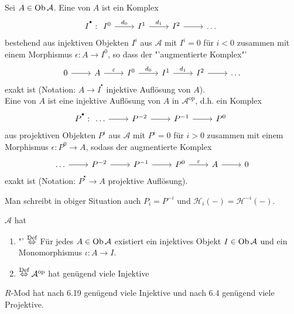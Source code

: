 \begin{df}\label{7.5}
	Sei $A\in \text{Ob}\,\mathcal{A}$. Eine  von $A$ ist ein Komplex 
	$$I^{^\bullet}: \begin{tikzcd}
	I^0\arrow{r}{d_0} & I^1 \arrow{r}{d_1}& I^2\arrow{r} & \ldots
	\end{tikzcd}$$
	bestehend aus injektiven Objekten $I^i$ aus $\mathcal{A}$ mit $I^i=0$ für $i<0$ zusammen mit einem Morphismus $\epsilon : A\longrightarrow I^0$, so dass der "'augmentierte Komplex"'
	$$\begin{tikzcd}
	0 \arrow{r}& A \arrow{r}{\epsilon} &I^0\arrow{r}{d_0} & I^1 \arrow{r}{d_1}& I^2\arrow{r} & \ldots
	\end{tikzcd}$$
	exakt ist (Notation: $A\longrightarrow I^{^\bullet}$ injektive Auflösung von $A$).\\
	Eine  von $A$ ist eine injektive Auflösung von $A$ in $\mathcal{A}^\text{op}$, d.h. ein Komplex 
	$$P^{^\bullet}: \begin{tikzcd}
	\ldots \arrow{r} &P^{-2} \arrow{r} & P^{-1} \arrow{r} & P^0
	\end{tikzcd}$$
	aus projektiven Objekten $P^i$ aus $\mathcal{A}$ mit $P^i=0$ für $i>0$ zusammen mit einem Morphismus $\epsilon:P^0 \to A$, sodass der augmentierte Komplex
	$$\begin{tikzcd}
	\ldots \arrow{r} & P^{-2} \arrow{r} &P^{-1} \arrow{r} & P^0 \arrow{r}{\epsilon} & A \arrow{r} & 0
		\end{tikzcd}$$
	exakt ist (Notation: $P^{^\bullet} \longrightarrow A$ projektive Auflösung).
\end{df}
\begin{anm}
	Man schreibt in obiger Situation auch $P_i = P^{-i}$ und $\mathcal{H}_i(-) = \mathcal{H}^{-i}(-)$.
\end{anm}
\begin{df}\label{7.7}
	$\mathcal{A}$ hat
	\begin{enumerate}
		\item[] "' $\overset{\text{Def}}{\Leftrightarrow}$ Für jedes $A\in \text{Ob}\,\mathcal{A}$ existiert ein injektives Objekt $I\in \text{Ob}\,\mathcal{A}$ und ein Monomorphismus $\iota:A \to I$.
		\item[]   $\overset{\text{Def}}{\Leftrightarrow} \mathcal{A}^\text{op}$ hat genügend viele Injektive
	\end{enumerate}
\end{df}
\begin{bsp}
	$R$-Mod hat nach 6.19 genügend viele Injektive und nach 6.4 genügend viele Projektive.
\end{bsp}
